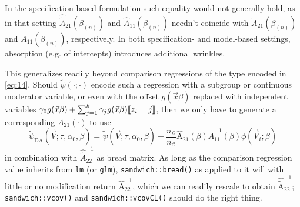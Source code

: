 \documentclass{article}
\DeclarePairedDelimiter{\indicator}{\llbracket}{\rrbracket}
\begin{document}
In the specification-based formulation such equality would not generally
hold, as in that setting
$\hat{\tilde{A}}_{21}(\beta_{(n)})$ and $\hat{A}_{11}(\beta_{(n)})$ needn't
coincide with $\tilde{A}_{21}(\beta_{(n)})$ and ${A}_{11}(\beta_{(n)})$, respectively.  In both specification- and model-based settings, absorption (e.g. of intercepts) introduces additional wrinkles.

This generalizes readily beyond comparison regressions of the type encoded in \eqref{eq:14}. Should $\tilde{\psi}(\cdot; \cdot)$ encode such a regression with a subgroup or continuous moderator variable, or even with the offset $g(\vec{x}\beta)$ replaced with independent variables $\gamma_{0}g(\vec{x}\beta) + \sum_{j=1}^{k}\gamma_{j} g(\vec{x}\beta)\indicator{z_{i}=j}$, then we only have to generate a corresponding ${A}_{21}(\cdot)$ to use
\begin{equation*}\label{eq:24}
      \tilde{\psi}_\text{DA}(\vec{V}; \tau, \alpha_{0},
    \beta) = \tilde{\psi} (\vec{V}; \tau,\alpha_{0},
    \beta) -
    \frac{n_{\mathcal{Q}}}{n_{\mathcal{C}}}
    \hat{\mathrm{A}}_{21}(\beta) \hat{A}_{11}^{-1}(\beta)\phi(\vec{V}_{i};
    \beta)
\end{equation*}
in combination with $\hat{\tilde{A}}_{22}^{-1}$ as bread matrix. As long as the comparison regression value inherits from \texttt{lm} (or \texttt{glm}), \texttt{sandwich::bread()} as applied to it will with little or no modification return
$\hat{\mathrm{A}}_{22}^{-1}$, which we can readily rescale to obtain $\hat{\tilde{\mathrm{A}}}_{22}^{-1}$; \texttt{sandwich::vcov()} and \texttt{sandwich::vcovCL()} should do the right thing.
\end{document}
